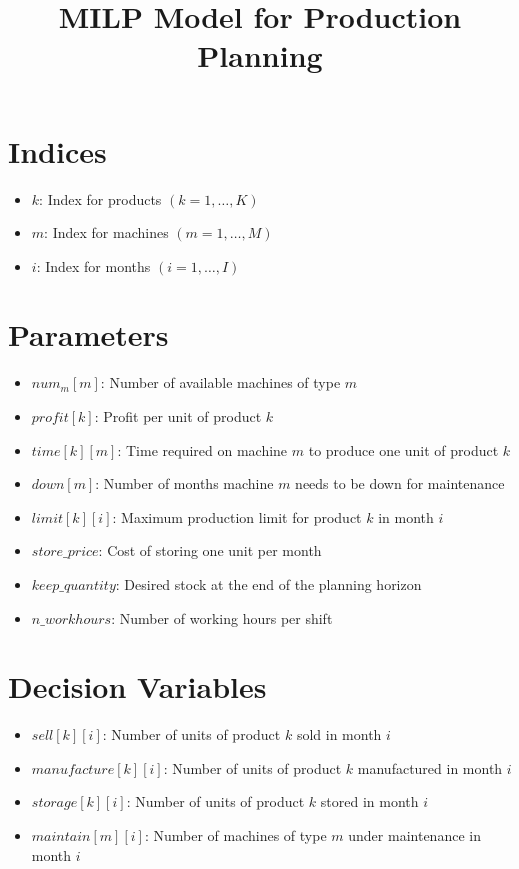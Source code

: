 \documentclass{article}
\begin{document}
\title{MILP Model for Production Planning}
\author{}
\date{}
\maketitle

\section*{Indices}
\begin{itemize}
    \item $k$: Index for products $(k = 1, \ldots, K)$
    \item $m$: Index for machines $(m = 1, \ldots, M)$
    \item $i$: Index for months $(i = 1, \ldots, I)$
\end{itemize}

\section*{Parameters}
\begin{itemize}
    \item $num_m[m]$: Number of available machines of type $m$
    \item $profit[k]$: Profit per unit of product $k$
    \item $time[k][m]$: Time required on machine $m$ to produce one unit of product $k$
    \item $down[m]$: Number of months machine $m$ needs to be down for maintenance
    \item $limit[k][i]$: Maximum production limit for product $k$ in month $i$
    \item $store\_price$: Cost of storing one unit per month
    \item $keep\_quantity$: Desired stock at the end of the planning horizon
    \item $n\_workhours$: Number of working hours per shift
\end{itemize}

\section*{Decision Variables}
\begin{itemize}
    \item $sell[k][i]$: Number of units of product $k$ sold in month $i$
    \item $manufacture[k][i]$: Number of units of product $k$ manufactured in month $i$
    \item $storage[k][i]$: Number of units of product $k$ stored in month $i$
    \item $maintain[m][i]$: Number of machines of type $m$ under maintenance in month $i$
\end{itemize}
\end{document}

